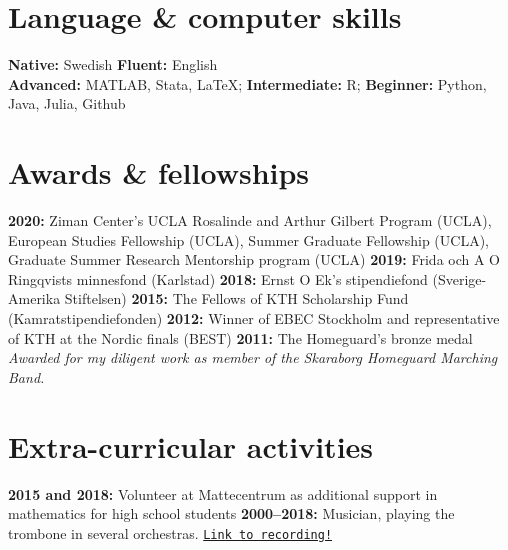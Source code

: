 \documentclass[letterpaper,10pt]{article}
\newcommand{\years}[1]{\ifhmode\hspace{6pt}\fi\textbf{#1:}}
\begin{document}
\section*{Language \& computer skills}
\years{Native} Swedish \years{Fluent} English \\
\years{Advanced} MATLAB, Stata, \LaTeX; \years{Intermediate} R; \years{Beginner} Python, Java, Julia, Github

\section*{Awards \& fellowships}
\years{2020} Ziman Center’s UCLA Rosalinde and Arthur Gilbert Program (UCLA), European Studies Fellowship (UCLA), Summer Graduate Fellowship (UCLA), Graduate Summer Research Mentorship program (UCLA) \years{2019} Frida och A O Ringqvists minnesfond (Karlstad) \years{2018} Ernst O Ek's stipendiefond (Sverige-Amerika Stiftelsen) \years{2015}
The Fellows of KTH Scholarship Fund (Kamratstipendiefonden) \years{2012} Winner of EBEC Stockholm and representative of KTH at the Nordic finals (BEST) \years{2011} The Homeguard's bronze medal \emph{Awarded for my diligent work as member of the Skaraborg Homeguard Marching Band.}

\section*{Extra-curricular activities} 
\years{2015 and 2018} Volunteer at Mattecentrum as additional support in mathematics for high school students \years{2000--2018} Musician, playing the trombone in several orchestras. \href{https://www.youtube.com/watch?v=nn6dDYi3AFg}{\texttt{Link to recording!}}
\iffalse
\iffalse
\emph{Several elected positions} in my division of KTH Student association, including:
\begin{lista2}
\emph{Treasurer} for a committee, \\
\emph{Producer} (head) for a play involving 100 people.  \years{2011--2015}
\end{lista2}
\fi
\emph{Musician}, playing the trombone in several orchestras.%
\years{2000--2018}

\fi
\end{document}
